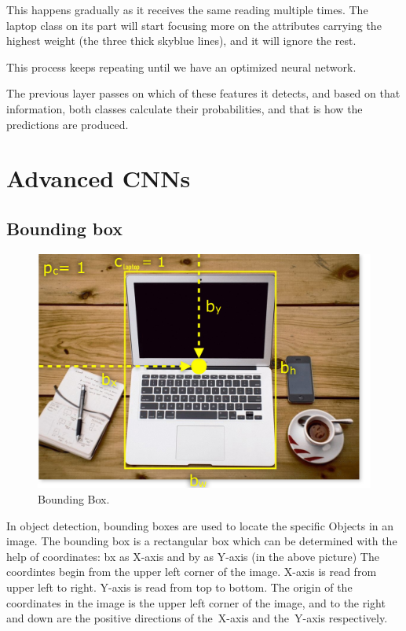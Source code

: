 \documentclass[a4paper,13pt,twoside]{book}
\begin{document}
This happens gradually as it receives the same reading multiple times. The laptop class on its part will start focusing more on the attributes carrying the highest weight (the three thick skyblue lines), and it will ignore the rest.

This process keeps repeating until we have an optimized neural network.

The previous layer passes on which of these features it detects, and based on that information, both classes calculate their probabilities, and that is how the predictions are produced.

\chapter{Advanced CNNs}

\section{Bounding box}

\begin{figure}[H]
  \includegraphics[width=\linewidth]{Images/boundingbox27.png}
  \caption{Bounding Box.}
  \label{fig:Bounding Box}
\end{figure}

In object detection, bounding boxes are used to locate the specific Objects in an image. The bounding box is a rectangular box which can be determined with the help of coordinates:
bx as X-axis and by as Y-axis (in the above picture)
The coordintes begin from the upper left corner of the image.
X-axis is read from upper left to right.
Y-axis is read from top to bottom.
The origin of the coordinates in the image is the upper left corner of the image, and to the right and down are the positive directions of the X-axis and the Y-axis respectively.
\end{document}
